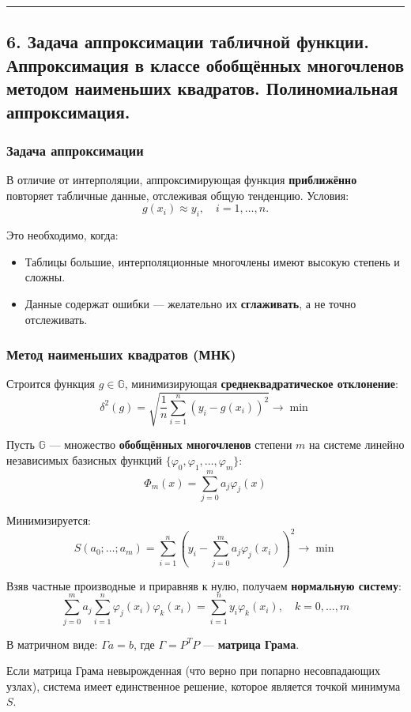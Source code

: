 \documentclass[14pt,a4paper]{extarticle}
\begin{document}
\hrule\bigskip

\subsection{6. Задача аппроксимации табличной функции. Аппроксимация в классе обобщённых многочленов методом наименьших квадратов. Полиномиальная аппроксимация.}

\subsubsection{Задача аппроксимации}

В отличие от интерполяции, аппроксимирующая функция \textbf{приближённо} повторяет табличные данные, отслеживая общую тенденцию. Условия:
\[g(x_i) \approx y_i, \quad i = 1, \ldots, n.\]

Это необходимо, когда:
\begin{itemize}
    \item Таблицы большие, интерполяционные многочлены имеют высокую степень и сложны.
    \item Данные содержат ошибки --- желательно их \textbf{сглаживать}, а не точно отслеживать.
\end{itemize}

\subsubsection{Метод наименьших квадратов (МНК)}

Строится функция $g \in \mathbb{G}$, минимизирующая \textbf{среднеквадратическое отклонение}:
\[\delta^2(g) = \sqrt{\frac{1}{n} \sum_{i=1}^{n} (y_i - g(x_i))^2} \to \min\]

Пусть $\mathbb{G}$ --- множество \textbf{обобщённых многочленов} степени $m$ на системе линейно независимых базисных функций $\{\varphi_0, \varphi_1, \ldots, \varphi_m\}$:
\[\Phi_m(x) = \sum_{j=0}^{m} a_j \varphi_j(x)\]

Минимизируется:
\[S(a_0; \ldots; a_m) = \sum_{i=1}^{n} \left(y_i - \sum_{j=0}^{m} a_j \varphi_j(x_i)\right)^2 \to \min\]

Взяв частные производные и приравняв к нулю, получаем \textbf{нормальную систему}:
\[\sum_{j=0}^{m} a_j \sum_{i=1}^{n} \varphi_j(x_i) \varphi_k(x_i) = \sum_{i=1}^{n} y_i \varphi_k(x_i), \quad k = 0, \ldots, m\]

В матричном виде: $\Gamma a = b$, где $\Gamma = P^T P$ --- \textbf{матрица Грама}.

Если матрица Грама невырожденная (что верно при попарно несовпадающих узлах), система имеет единственное решение, которое является точкой минимума $S$.
\end{document}
